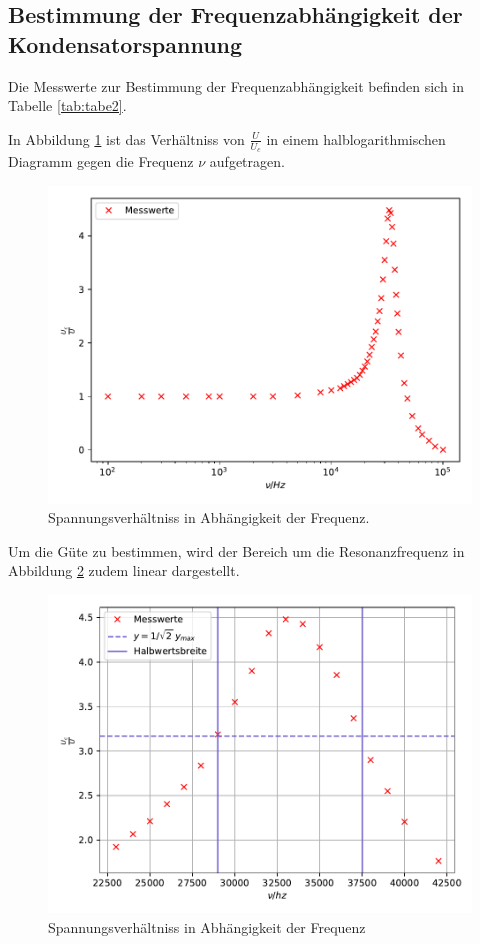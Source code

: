 \subsection{Bestimmung der Frequenzabhängigkeit der Kondensatorspannung}

Die Messwerte zur Bestimmung der Frequenzabhängigkeit befinden sich in Tabelle \ref{tab:tabe2}.


\noindent In Abbildung \ref{fig:plot2} ist das Verhältniss von $ \frac{U}{U_c} $ in einem
halblogarithmischen Diagramm gegen die Frequenz $ \nu $ aufgetragen.

\begin{figure}[H]
  \centering
  \includegraphics{plot2.pdf}
  \caption{Spannungsverhältniss in Abhängigkeit der Frequenz.}
  \label{fig:plot2}
\end{figure}
\noindent Um die Güte zu bestimmen, wird der Bereich um die Resonanzfrequenz
in Abbildung \ref{fig:plot3}
zudem linear dargestellt.

\begin{figure}[H]
  \centering
  \includegraphics{plot3.pdf}
  \caption{Spannungsverhältniss in Abhängigkeit der Frequenz}
  \label{fig:plot3}
\end{figure}


